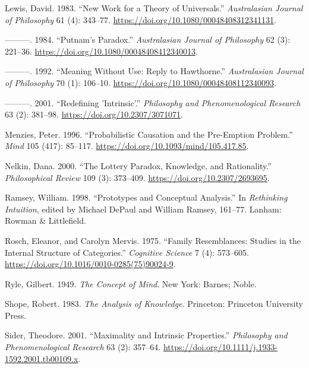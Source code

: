 \documentclass[
  11pt,
  letterpaper,
  DIV=11,
  numbers=noendperiod,
  oneside]{scrartcl}
\newlength{\cslhangindent}
\newenvironment{CSLReferences}[2] %
 {\begin{list}{}{%
  \setlength{\itemindent}{0pt}
  \setlength{\leftmargin}{0pt}
  \setlength{\parsep}{0pt}
  \ifodd #1
   \setlength{\leftmargin}{\cslhangindent}
   \setlength{\itemindent}{-1\cslhangindent}
  \fi
  \setlength{\itemsep}{#2\baselineskip}}}
 {\end{list}}
\begin{document}
\begin{CSLReferences}{1}{0}
Lewis, David. 1983. {``New Work for a Theory of Universals.''}
\emph{Australasian Journal of Philosophy} 61 (4): 343--77.
\url{https://doi.org/10.1080/00048408312341131}.

---------. 1984. {``Putnam's Paradox.''} \emph{Australasian Journal of
Philosophy} 62 (3): 221--36.
\url{https://doi.org/10.1080/00048408412340013}.

---------. 1992. {``Meaning Without Use: Reply to {H}awthorne.''}
\emph{Australasian Journal of Philosophy} 70 (1): 106--10.
\url{https://doi.org/10.1080/00048408112340093}.

---------. 2001. {``Redefining 'Intrinsic'.''} \emph{Philosophy and
Phenomenological Research} 63 (2): 381--98.
\url{https://doi.org/10.2307/3071071}.

Menzies, Peter. 1996. {``Probabilistic Causation and the Pre-Emption
Problem.''} \emph{Mind} 105 (417): 85--117.
\url{https://doi.org/10.1093/mind/105.417.85}.

Nelkin, Dana. 2000. {``The Lottery Paradox, Knowledge, and
Rationality.''} \emph{Philosophical Review} 109 (3): 373--409.
\url{https://doi.org/10.2307/2693695}.

Ramsey, William. 1998. {``Prototypes and Conceptual Analysis.''} In
\emph{Rethinking Intuition}, edited by Michael DePaul and William
Ramsey, 161--77. Lanham: Rowman \& Littlefield.

Rosch, Eleanor, and Carolyn Mervis. 1975. {``Family Resemblances:
Studies in the Internal Structure of Categories.''} \emph{Cognitive
Science} 7 (4): 573--605.
\url{https://doi.org/10.1016/0010-0285(75)90024-9}.

Ryle, Gilbert. 1949. \emph{The Concept of Mind}. New York: Barnes;
Noble.

Shope, Robert. 1983. \emph{The Analysis of Knowledge}. Princeton:
Princeton University Press.

Sider, Theodore. 2001. {``{Maximality and Intrinsic Properties}.''}
\emph{Philosophy and Phenomenological Research} 63 (2): 357--64.
\url{https://doi.org/10.1111/j.1933-1592.2001.tb00109.x}.


\end{CSLReferences}
\end{document}
